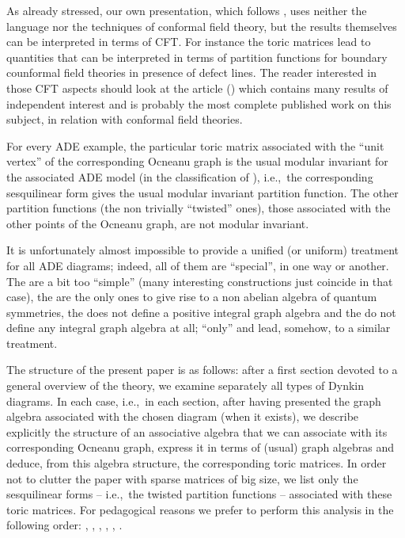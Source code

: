 \documentclass[a4paper,11pt]{article}
\def\ie{{\rm i.e.,\/}\ }
\begin{document}
As already stressed, our own 
presentation, which follows \cite{Coque:qtetra}, uses neither the 
language nor the techniques  of conformal field theory, but 
the results themselves can be interpreted in terms of CFT. For 
instance the toric matrices lead to quantities that can be
interpreted in terms of partition functions for boundary counformal 
field theories in presence of defect lines. The reader interested in 
those CFT aspects should look at the article (\cite{PetZub:Oc}) which contains
many results of independent interest and is
probably the most complete published work on this subject, in
relation with conformal field theories. 

For every ADE example, the particular toric matrix associated with the 
``unit vertex''  
of the corresponding Ocneanu graph is the usual modular invariant for the 
associated  
ADE model (in the classification of \cite{CapItzZub}), \ie the
corresponding sesquilinear form gives the usual modular invariant partition
function. The other partition functions (the non trivially ``twisted''
ones), those associated with the other points of the Ocneanu graph,
are not modular invariant.


It is unfortunately almost impossible to provide a unified (or
uniform) treatment for all ADE diagrams; indeed, all of them are
``special'', in one way or another. The \coordHE{} are a bit too
``simple'' (many interesting constructions just coincide in that
case), the \coordHE{} are the only ones to give rise to a non abelian
algebra of quantum symmetries, the \coordHE{} does not define a positive
integral graph algebra and the \coordHE{} do not define any integral
graph algebra at all; ``only'' \coordHE{} and \coordHE{} lead, somehow, to
a similar
treatment.

The structure of the present paper is as follows:
after a first section devoted to a general overview of the theory, we
examine separately all types of \coordHE{} Dynkin diagrams. In each case,
\ie in each section, after having presented the graph algebra associated
with the chosen diagram (when it exists), we describe
explicitly the structure of an associative algebra that we can
associate with its corresponding Ocneanu graph, express it
in terms of (usual) graph algebras and deduce, from this
algebra structure, the corresponding toric matrices.
In order not to clutter the paper with sparse matrices of big size,
we list only the
sesquilinear forms -- \ie the twisted partition functions --
associated with these toric matrices. For pedagogical reasons we prefer to
perform this analysis in the following order: \coordHE{}, \coordHE{}, \coordHE{},
       \coordHE{}, \coordHE{}, \coordHE{}.
\end{document}
